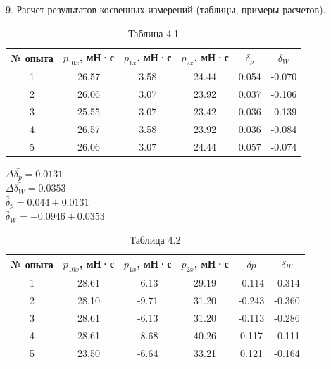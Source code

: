 \documentclass[12pt]{article}
\begin{document}
\begin{flushleft}
    9. Расчет результатов косвенных измерений (таблицы, примеры расчетов). \\
    \begin{table}[h]
        \centering
        \renewcommand{\arraystretch}{1.3}
        \setlength{\tabcolsep}{8pt}
        \captionsetup{justification=centering, font=bf}
        \caption{Таблица 4.1}
        \begin{tabular}{|c|c|c|c|c|c|}
            \hline
            № опыта & \( p_{10x} \), мН·с & \( p_{1x} \), мН·с & \( p_{2x} \), мН·с & \( \delta_p \) & \( \delta_W \) \\
            \hline
            1 & 26.57 & 3.58 & 24.44 & 0.054 & -0.070 \\
            \hline
            2 & 26.06 & 3.07 & 23.92 & 0.037 & -0.106 \\
            \hline
            3 & 25.55 & 3.07 & 23.42 & 0.036 & -0.139 \\
            \hline
            4 & 26.57 & 3.58 & 23.92 & 0.036 & -0.084 \\
            \hline
            5 & 26.06 & 3.07 & 24.44 & 0.057 & -0.074 \\
            \hline
        \end{tabular}
    \end{table}

    $ \Delta \bar{\delta_p} = 0.0131 $ \\
    $ \Delta \bar{\delta_W} = 0.0353 $ \\
    $ \bar{\delta}_p = 0.044 \pm0.0131 $ \\
    $ \bar{\delta}_W  = -0.0946 \pm0.0353 $ \\
    
    \newpage

    \begin{table}[h]
        \centering
        \renewcommand{\arraystretch}{1.3}
        \setlength{\tabcolsep}{8pt}
        \captionsetup{justification=centering, font=bf}
        \caption{Таблица 4.2}
        \begin{tabular}{|c|c|c|c|c|c|}
            \hline
            № опыта & \( p_{10x} \), мН·с & \( p_{1x} \), мН·с & \( p_{2x} \), мН·с & \( \delta p \) & \( \delta w \) \\
            \hline
            1 & 28.61 & -6.13 & 29.19 & -0.114 & -0.314 \\
            \hline
            2 & 28.10 & -9.71 & 31.20 & -0.243 & -0.360 \\
            \hline
            3 & 28.61 & -6.13 & 31.20 & -0.113 & -0.286 \\
            \hline
            4 & 28.61 & -8.68 & 40.26 & 0.117 & -0.111 \\
            \hline
            5 & 23.50 & -6.64 & 33.21 & 0.121 & -0.164 \\
            \hline
        \end{tabular}
    \end{table}    


\end{flushleft}
\end{document}
